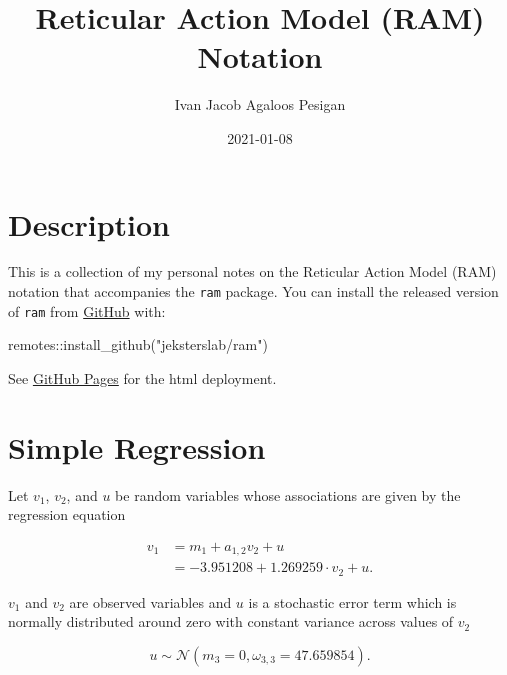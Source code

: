 \documentclass[
]{book}
\title{Reticular Action Model (RAM) Notation}
\author{Ivan Jacob Agaloos Pesigan}
\date{2021-01-08}
\newenvironment{Shaded}{\begin{snugshade}}{\end{snugshade}}
\newcommand{\FunctionTok}[1]{\textcolor[rgb]{0.00,0.00,0.00}{#1}}
\newcommand{\NormalTok}[1]{#1}
\newcommand{\SpecialCharTok}[1]{\textcolor[rgb]{0.00,0.00,0.00}{#1}}
\newcommand{\StringTok}[1]{\textcolor[rgb]{0.31,0.60,0.02}{#1}}
\begin{document}
\maketitle

{
\setcounter{tocdepth}{1}
\tableofcontents
}
\hypertarget{description}{%
\chapter{Description}\label{description}}

This is a collection of my personal notes on the Reticular Action Model (RAM) notation
that accompanies the \texttt{ram} package.
You can install the released version of \texttt{ram} from \href{https://github.com/jeksterslab/ram}{GitHub} with:

\begin{Shaded}
\begin{Highlighting}[]
\NormalTok{remotes}\SpecialCharTok{::}\FunctionTok{install\_github}\NormalTok{(}\StringTok{"jeksterslab/ram"}\NormalTok{)}
\end{Highlighting}
\end{Shaded}

See \href{https://jeksterslab.github.io/ram_notes/index.html}{GitHub Pages}
for the html deployment.

\hypertarget{simple-regression}{%
\chapter{Simple Regression}\label{simple-regression}}

Let \(v_1\), \(v_2\), and \(u\) be random variables whose associations are given by the regression equation

\begin{equation}
  \begin{split}
    v_1
    &=
    m_1 + a_{1, 2} v_2 + u \\
    &=
    -3.951208 + 1.269259 \cdot v_2 + u .
  \end{split}
\end{equation}

\noindent \(v_1\) and \(v_2\) are observed variables and
\(u\) is a stochastic error term which is normally distributed around zero
with constant variance across values of \(v_2\)

\begin{equation}
  u 
  \sim 
  \mathcal{N} \left( m_3 = 0, \omega_{3, 3} = 47.659854 \right) .
\end{equation}
\end{document}
